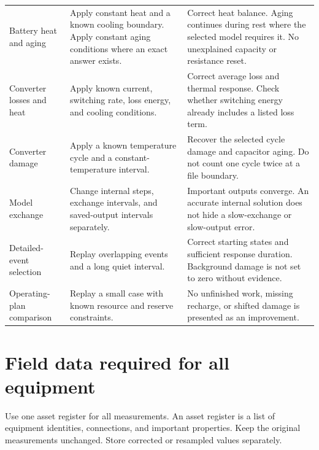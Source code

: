 \documentclass[11pt,a4paper]{report}
\begin{document}
\begin{longtable}{L{0.17\textwidth}L{0.36\textwidth}L{0.35\textwidth}}
Battery heat and aging & Apply constant heat and a known cooling boundary. Apply constant aging conditions where an exact answer exists. & Correct heat balance. Aging continues during rest where the selected model requires it. No unexplained capacity or resistance reset. \\
Converter losses and heat & Apply known current, switching rate, loss energy, and cooling conditions. & Correct average loss and thermal response. Check whether switching energy already includes a listed loss term. \\
Converter damage & Apply a known temperature cycle and a constant-temperature interval. & Recover the selected cycle damage and capacitor aging. Do not count one cycle twice at a file boundary. \\
Model exchange & Change internal steps, exchange intervals, and saved-output intervals separately. & Important outputs converge. An accurate internal solution does not hide a slow-exchange or slow-output error. \\
Detailed-event selection & Replay overlapping events and a long quiet interval. & Correct starting states and sufficient response duration. Background damage is not set to zero without evidence. \\
Operating-plan comparison & Replay a small case with known resource and reserve constraints. & No unfinished work, missing recharge, or shifted damage is presented as an improvement. \\
\bottomrule
\end{longtable}

\section{Field data required for all equipment}
Use one asset register for all measurements.
An asset register is a list of equipment identities, connections, and important properties.
Keep the original measurements unchanged.
Store corrected or resampled values separately.
\end{document}
